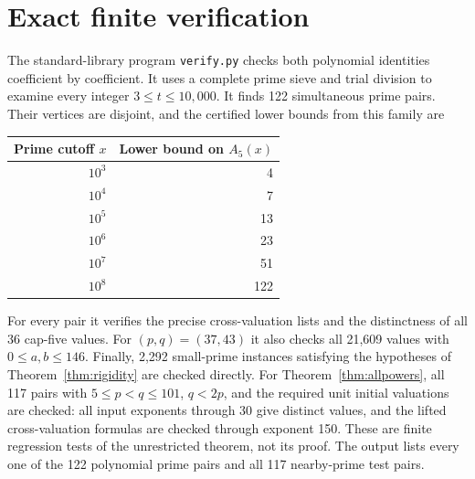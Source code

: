 \documentclass[11pt]{article}
\begin{document}
\section{Exact finite verification}
The standard-library program \texttt{verify.py} checks both polynomial identities coefficient by coefficient. It uses a complete prime sieve and trial division to examine every integer $3\le t\le10{,}000$. It finds 122 simultaneous prime pairs. Their vertices are disjoint, and the certified lower bounds from this family are
\begin{center}
\begin{tabular}{@{}rr@{}}\toprule
Prime cutoff $x$&Lower bound on $A_5(x)$\\\midrule
$10^3$&4\\
$10^4$&7\\
$10^5$&13\\
$10^6$&23\\
$10^7$&51\\
$10^8$&122\\\bottomrule
\end{tabular}
\end{center}
For every pair it verifies the precise cross-valuation lists and the distinctness of all 36 cap-five values. For $(p,q)=(37,43)$ it also checks all 21,609 values with $0\le a,b\le146$. Finally, 2,292 small-prime instances satisfying the hypotheses of Theorem~\ref{thm:rigidity} are checked directly. For Theorem~\ref{thm:allpowers}, all 117 pairs with $5\le p<q\le101$, $q<2p$, and the required unit initial valuations are checked: all input exponents through 30 give distinct values, and the lifted cross-valuation formulas are checked through exponent 150. These are finite regression tests of the unrestricted theorem, not its proof. The output lists every one of the 122 polynomial prime pairs and all 117 nearby-prime test pairs.
\end{document}
